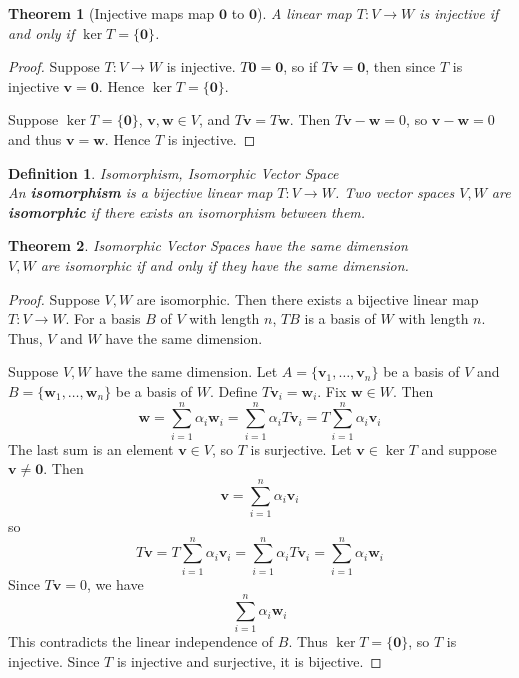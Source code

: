 \documentclass[12pt]{article}
\newtheorem{thm}{Theorem}[section] %
\theoremstyle{plain}
\newtheorem{definition}{Definition}[section]
\newcommand{\vv}{\mathbf{v}}
\newcommand{\vw}{\mathbf{w}}
\newcommand{\vzero}{\mathbf{0}}
\begin{document}
    \begin{thm}[Injective maps map $\vzero$ to $\vzero$]
        A linear map $T:V \to W$ is injective if and only if $\ker T = \{\vzero\}$.
    \end{thm}

    \begin{proof}
        Suppose $T:V \to W$ is injective. $T\vzero = \vzero$, so if $T\vv = \vzero$, then since $T$ is injective $\vv = \vzero$. Hence $\ker T = \{\vzero\}$.

        Suppose $\ker T = \{\vzero\}$, $\vv, \vw \in V$, and $T\vv = T\vw$. Then $T\vv - \vw = 0$, so $\vv - \vw = 0$ and thus $\vv = \vw$. Hence $T$ is injective.
    \end{proof}

    \begin{definition}{Isomorphism, Isomorphic Vector Space}
        ~\\An \textbf{isomorphism} is a bijective linear map $T:V \to W$. Two vector spaces $V,W$ are \textbf{isomorphic} if there exists an isomorphism between them. 
    \end{definition}

    \begin{thm}{Isomorphic Vector Spaces have the same dimension}
        ~\\$V,W$ are isomorphic if and only if they have the same dimension.
    \end{thm}

    \begin{proof}
        Suppose $V, W$ are isomorphic. Then there exists a bijective linear map $T:V \to W$. For a basis $B$ of $V$ with length $n$, $TB$ is a basis of $W$ with length $n$. Thus, $V$ and $W$ have the same dimension.

        Suppose $V, W$ have the same dimension. Let $A = \{\vv_1, \dots, \vv_n\}$ be a basis of $V$ and $B = \{\vw_1, \dots, \vw_n\}$ be a basis of $W$. Define $T\vv_i = \vw_i$. Fix $\vw \in W$. Then $$\vw = \sum_{i = 1}^n \alpha_i \vw_i = \sum_{i = 1}^n \alpha_i T\vv_i = T\sum_{i = 1}^n \alpha_i \vv_i$$The last sum is an element $\vv \in V$, so $T$ is surjective. Let $\vv \in \ker T$ and suppose $\vv \neq \vzero$. Then $$\vv = \sum_{i = 1}^n \alpha_i \vv_i$$so $$T\vv = T\sum_{i = 1}^n \alpha_i \vv_i = \sum_{i = 1}^n \alpha_i T\vv_i = \sum_{i = 1}^n \alpha_i \vw_i$$Since $T\vv = 0$, we have $$\sum_{i = 1}^n \alpha_i \vw_i$$This contradicts the linear independence of $B$. Thus $\ker T = \{\vzero\}$, so $T$ is injective. Since $T$ is injective and surjective, it is bijective.
    \end{proof}
\end{document}
